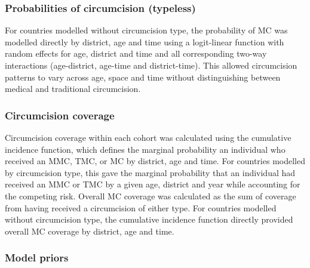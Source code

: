 \documentclass{article}
\begin{document}
\subsubsection*{Probabilities of circumcision (typeless)}


For countries modelled without circumcision type, the probability of MC was modelled directly by district, age and time using a logit-linear function with random effects for age, district and time and all corresponding two-way interactions (age-district, age-time and district-time). This allowed circumcision patterns to vary across age, space and time without distinguishing between medical and traditional circumcision.


\subsubsection*{Circumcision coverage}


Circumcision coverage within each cohort was calculated using the cumulative incidence function, which defines the marginal probability an individual who received an MMC, TMC, or MC by district, age and time. For countries modelled by circumcision type, this gave the marginal probability that an individual had received an MMC or TMC by a given age, district and year while accounting for the competing risk. Overall MC coverage was calculated as the sum of coverage from having received a circumcision of either type. For countries modelled without circumcision type, the cumulative incidence function directly provided overall MC coverage by district, age and time.


\subsubsection*{Model priors}
\end{document}
